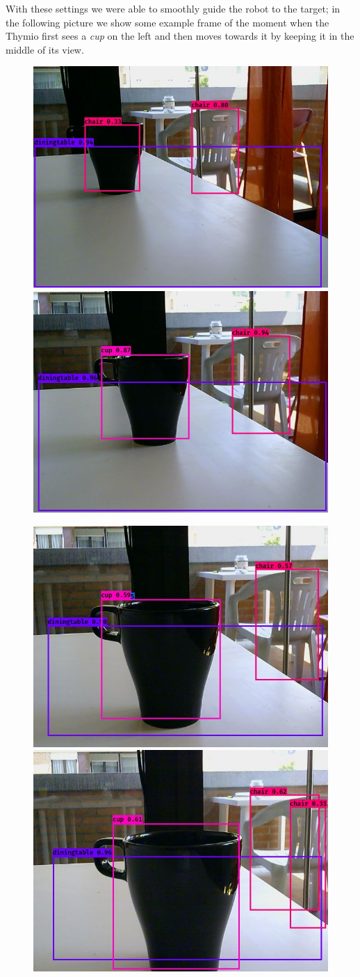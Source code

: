 \documentclass[letterpaper, 10 pt, conference]{ieeeconf}  %
\begin{document}
With these settings we were able to smoothly guide the robot to the target; in the following picture we show some example frame of the moment when the Thymio first sees a \emph{cup} on the left and then moves towards it by keeping it in the middle of its view.
\begin{figure}[H]
\begin{center}
\includegraphics[width=0.48\linewidth]{images/cup/1}	
\includegraphics[width=0.48\linewidth]{images/cup/2}	
\end{center}
\begin{center}
\includegraphics[width=0.48\linewidth]{images/cup/3}	
\includegraphics[width=0.48\linewidth]{images/cup/4}	

\end{center}
\end{figure}
\end{document}
